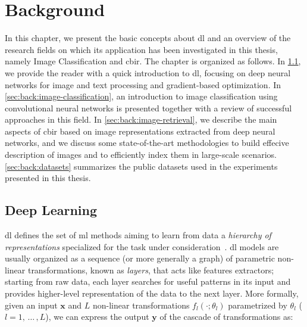 
\def\x{\mathbf{x}} %
\def\X{\mathbf{X}} %
\def\y{\mathbf{y}} %
\def\Y{\mathbf{Y}} %
\def\w{\mathbf{w}} %
\def\W{\mathbf{W}} %
\def\b{\mathbf{b}} %
\def\R{\mathbb{R}} %
\def\L{\mathcal{L}} %
\def\a{\varphi} %

\def\({\left (} %
\def\){\right )} %


\chapter{Background}
\label{ch:background}

In this chapter, we present the basic concepts about \gls{dl} and an overview of the research fields on which its application has been investigated in this thesis, namely Image Classification and \gls{cbir}.
The chapter is organized as follows.
In \ref{sec:back:deep-learning}, we provide the reader with a quick introduction to \gls{dl}, focusing on deep neural networks for image and text processing and gradient-based optimization.
In \ref{sec:back:image-classification}, an introduction to image classification using convolutional neural networks is presented together with a review of successful approaches in this field.
In \ref{sec:back:image-retrieval}, we describe the main aspects of \gls{cbir} based on image representations extracted from deep neural networks, and we discuss some state-of-the-art methodologies to build effecive description of images and to efficiently index them in large-scale scenarios.
\ref{sec:back:datasets} summarizes the public datasets used in the experiments presented in this thesis.


\section{Deep Learning}
\label{sec:back:deep-learning}

\acrfull{dl} defines the set of \gls{ml} methods aiming to learn from data a \emph{hierarchy of representations} specialized for the task under consideration~\cite{goodfellow2016deep}.
\gls{dl} models are usually organized as a sequence (or more generally a graph) of parametric non-linear transformations, known as \emph{layers}, that acts like features extractors;
starting from raw data, each layer searches for useful patterns in its input and provides higher-level representation of the data to the next layer.
More formally, given an input $\x$ and $L$ non-linear transformations $f_l\(\cdot; \theta_l\)$ parametrized by $\theta_l$ ($l=1,\, \dots\,, L$), we can express the output $\y$ of the cascade of transformations as:

